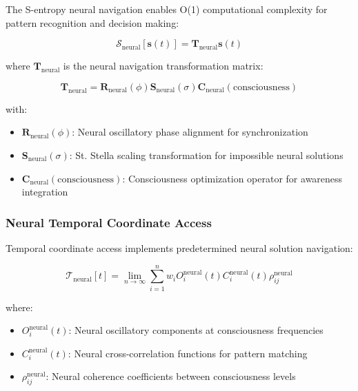 \documentclass[12pt,a4paper]{article}
\theoremstyle{remark}
\begin{document}
The S-entropy neural navigation enables O(1) computational complexity for pattern recognition and decision making:

\begin{equation}
\mathcal{S}_{\text{neural}}[\mathbf{s}(t)] = \mathbf{T}_{\text{neural}} \mathbf{s}(t)
\end{equation}

where $\mathbf{T}_{\text{neural}}$ is the neural navigation transformation matrix:

\begin{equation}
\mathbf{T}_{\text{neural}} = \mathbf{R}_{\text{neural}}(\phi) \mathbf{S}_{\text{neural}}(\sigma) \mathbf{C}_{\text{neural}}(\text{consciousness})
\end{equation}

with:
\begin{itemize}
\item $\mathbf{R}_{\text{neural}}(\phi)$: Neural oscillatory phase alignment for synchronization
\item $\mathbf{S}_{\text{neural}}(\sigma)$: St. Stella scaling transformation for impossible neural solutions
\item $\mathbf{C}_{\text{neural}}(\text{consciousness})$: Consciousness optimization operator for awareness integration
\end{itemize}

\subsubsection{Neural Temporal Coordinate Access}

Temporal coordinate access implements predetermined neural solution navigation:

\begin{equation}
\mathcal{T}_{\text{neural}}[t] = \lim_{n \to \infty} \sum_{i=1}^{n} w_i O_i^{\text{neural}}(t) C_i^{\text{neural}}(t) \rho_{ij}^{\text{neural}}
\end{equation}

where:
\begin{itemize}
\item $O_i^{\text{neural}}(t)$: Neural oscillatory components at consciousness frequencies
\item $C_i^{\text{neural}}(t)$: Neural cross-correlation functions for pattern matching
\item $\rho_{ij}^{\text{neural}}$: Neural coherence coefficients between consciousness levels
\end{itemize}
\end{document}
